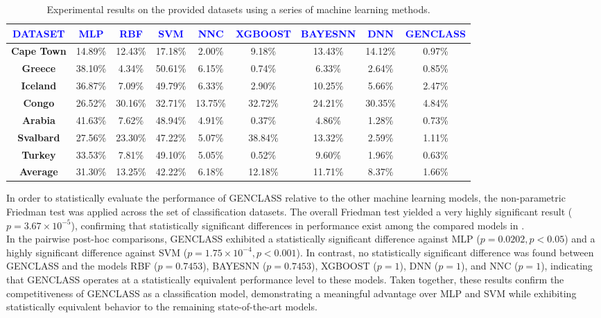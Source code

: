 \documentclass[12pt]{Definitions/academia}
\begin{document}
\begin{table}[H]
	\centering
	\footnotesize
\begin{tabular}{|c|c|c|c|c|c|c|c|c|}
\hline
\textbf{\textcolor{blue}{DATASET}} & \textbf{\textcolor{blue}{MLP}} & \textbf{\textcolor{blue}{RBF}} & \textbf{\textcolor{blue}{SVM}} & \textbf{\textcolor{blue}{NNC}} &
\textbf{\textcolor{blue}{XGBOOST}} &
\textbf{\textcolor{blue}{BAYESNN}} &
\textbf{\textcolor{blue}{DNN}} &
\textbf{\textcolor{blue}{GENCLASS}}\tabularnewline
\hline
\hline
\textbf{Cape Town} & 14.89\% & 12.43\% & 17.18\% & 2.00\% &
9.18\% & 13.43\%&14.12\% &
0.97\%\tabularnewline
\hline
\textbf{Greece} & 38.10\% & 4.34\% & 50.61\% & 6.15\% &
0.74\% & 6.33\% & 2.64\% &
0.85\%\tabularnewline
\hline
\textbf{Iceland} & 36.87\% & 7.09\% & 49.79\% & 6.33\% &
2.90\% & 10.25\% & 5.66\% &
2.47\%\tabularnewline
\hline
\textbf{Congo} & 26.52\% & 30.16\% & 32.71\% & 13.75\% &
32.72\% & 24.21\% & 30.35\% &
4.84\%\tabularnewline
\hline
\textbf{Arabia} & 41.63\% & 7.62\% & 48.94\% & 4.91\% &
0.37\% & 4.86\% & 1.28\% &
0.73\%\tabularnewline
\hline
\textbf{Svalbard} & 27.56\% & 23.30\% & 47.22\% & 5.07\% &
38.84\% & 13.32\%  & 2.59\% &
1.11\%\tabularnewline
\hline
\textbf{Turkey} & 33.53\% & 7.81\% & 49.10\% & 5.05\% &
0.52\% & 9.60\% & 1.96\% &
0.63\%\tabularnewline
\hline
\textbf{Average} & 31.30\% & 13.25\% & 42.22\% & 6.18\% &
12.18\% & 11.71\% & 8.37\% &
1.66\%\tabularnewline
\hline
\end{tabular}
\vspace{2em}
\caption{Experimental results on the provided datasets using a series of machine
learning methods\label{tab:Table-6-Experimental-results-on}.}
\end{table}

In order to statistically evaluate the performance of GENCLASS relative to the other machine learning models, the non-parametric Friedman test was applied across the set of classification datasets. The overall Friedman test yielded a very highly significant result ($p = 3.67 \times10^{-5}$), confirming that statistically significant differences in performance exist among the compared models in  .\\
In the pairwise post-hoc comparisons, GENCLASS exhibited a statistically significant difference against MLP ($p = 0.0202, p < 0.05$) and a highly significant difference against SVM ($p = 1.75 \times 10^{-4}, p <0.001$). In contrast, no statistically significant difference was found between GENCLASS and the models RBF ($p = 0.7453$), BAYESNN ($p = 0.7453$), XGBOOST ($p = 1$), DNN ($p = 1$), and NNC ($p = 1$), indicating that GENCLASS operates at a statistically equivalent performance level to these models. Taken together, these results confirm the competitiveness of GENCLASS as a classification model, demonstrating a meaningful advantage over MLP and SVM while exhibiting statistically equivalent behavior to the remaining state-of-the-art models.
\end{document}
